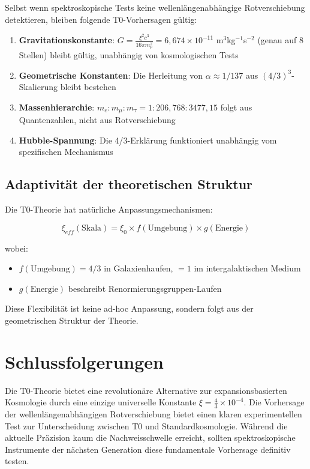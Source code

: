 \documentclass[12pt,a4paper]{article}
\newcommand{\xiconst}{\xi = \frac{4}{3} \times 10^{-4}}
\theoremstyle{definition}
\begin{document}
	Selbst wenn spektroskopische Tests keine wellenl\"angenabh\"angige Rotverschiebung detektieren, bleiben folgende T0-Vorhersagen g\"ultig:
	
	\begin{enumerate}
		\item \textbf{Gravitationskonstante}: $G = \frac{\xi^2 c^3}{16\pi m_p^2} = 6,674 \times 10^{-11}$ m$^3$kg$^{-1}$s$^{-2}$ (genau auf 8 Stellen) bleibt g\"ultig, unabh\"angig von kosmologischen Tests
		
		\item \textbf{Geometrische Konstanten}: Die Herleitung von $\alpha \approx 1/137$ aus $(4/3)^3$-Skalierung bleibt bestehen
		
		\item \textbf{Massenhierarchie}: $m_e : m_\mu : m_\tau = 1 : 206,768 : 3477,15$ folgt aus Quantenzahlen, nicht aus Rotverschiebung
		
		\item \textbf{Hubble-Spannung}: Die 4/3-Erkl\"arung funktioniert unabh\"angig vom spezifischen Mechanismus
	\end{enumerate}
	
	\subsection{Adaptivit\"at der theoretischen Struktur}
	
	Die T0-Theorie hat nat\"urliche Anpassungsmechanismen:
	
	\begin{equation}
		\xi_{eff}(\text{Skala}) = \xi_0 \times f(\text{Umgebung}) \times g(\text{Energie})
	\end{equation}
	
	wobei:
	\begin{itemize}
		\item $f(\text{Umgebung}) = 4/3$ in Galaxienhaufen, $= 1$ im intergalaktischen Medium
		\item $g(\text{Energie})$ beschreibt Renormierungsgruppen-Laufen
	\end{itemize}
	
	Diese Flexibilit\"at ist keine ad-hoc Anpassung, sondern folgt aus der geometrischen Struktur der Theorie.
	
	\section{Schlussfolgerungen}
	
	Die T0-Theorie bietet eine revolution\"are Alternative zur expansionsbasierten Kosmologie durch eine einzige universelle Konstante $\xiconst$. Die Vorhersage der wellenl\"angenabh\"angigen Rotverschiebung bietet einen klaren experimentellen Test zur Unterscheidung zwischen T0 und Standardkosmologie. W\"ahrend die aktuelle Pr\"azision kaum die Nachweisschwelle erreicht, sollten spektroskopische Instrumente der n\"achsten Generation diese fundamentale Vorhersage definitiv testen.
	
\end{document}
